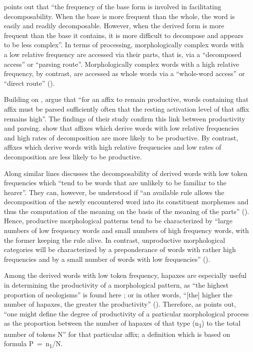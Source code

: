 \begin{enumerate}
\begin{enumerate}
\citet[1044–1047]{Hay.2001} points out that “the frequency of the base form is involved in facilitating decomposability. When the base is more frequent than the whole, the word is easily and readily decomposable. However, when the derived form is more frequent than the base it contains, it is more difficult to decompose and appears to be less complex”. In terms of processing, morphologically complex words with a low relative frequency are accessed via their parts, that is, via a “decomposed access” or “parsing route”. Morphologically complex words with a high relative frequency, by contrast, are accessed as whole words via a “whole-word access” or “direct route” (\citeyear*[1055]{Hay.2001}).



Building on \citet{Hay.2001}, \citet[203–204]{Hay.2002} argue that “for an affix to remain productive, words containing that affix must be parsed sufficiently often that the resting activation level of that affix remains high”. The findings of their study confirm this link between productivity and parsing. \citet{Hay.2002} show that affixes which derive words with low relative frequencies and high rates of decomposition are more likely to be productive. By contrast, affixes which derive words with high relative frequencies and low rates of decomposition are less likely to be productive.



Along similar lines \citet[542]{Plag.2006b} discusses the decomposability of derived words with low token frequencies which “tend to be words that are unlikely to be familiar to the hearer”. They can, however, be understood if “an available  rule allows the decomposition of the newly encountered word into its constituent morphemes and thus the computation of the meaning on the basis of the meaning of the parts” (\citeyear*[542]{Plag.2006b}). Hence, productive morphological patterns tend to be characterized by “large numbers of low frequency words and small numbers of high frequency words, with the former keeping the rule alive. In contrast, unproductive morphological categories will be characterized by a preponderance of words with rather high frequencies and by a small number of words with low frequencies” (\citeyear*[542]{Plag.2006b}).



Among the derived words with low token frequency, hapaxes are especially useful in determining the productivity of a morphological pattern, as “the highest proportion of neologisms” is found here \citep[542]{Plag.2006b}; or in other words, “[the] higher the number of hapaxes, the greater the productivity” (\citeyear*[544]{Plag.2006b}). Therefore, as \citet[69–70]{Booij.2007} points out, “one might define the degree of productivity  of a particular morphological process as the proportion between the number of hapaxes of that type (n\textsubscript{1}) to the total number of tokens N” for that particular affix; a definition which is based on  formula P~=~n\textsubscript{1}/N.




\end{enumerate}
\end{enumerate}
